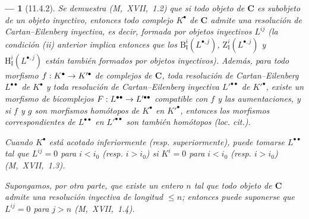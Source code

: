 \documentclass[10pt,oneside,openany]{book}
\theoremstyle{egaenv}\newtheorem*{env}{---}
\theoremstyle{egastatement}
\theoremstyle{egadescription}
\renewcommand{\leq}{\leqslant}
\renewcommand{\to}{\mathchoice{\longrightarrow}{\rightarrow}{\rightarrow}{\rightarrow}}
\begin{document}
\begin{env}[11.4.2]
Se demuestra (M,~XVII,~1.2) que si todo objeto de $\boldsymbol{C}$ es subobjeto de un objeto inyectivo, entonces todo complejo $K^\bullet$ de $\boldsymbol{C}$ admite una resolución de Cartan--Eilenberg \emph{inyectiva}, es decir, formada por objetos inyectivos $L^{ij}$ (la condición (ii) anterior implica entonces que los $\mathrm B_{\mathrm I}^i(L^{\bullet,j})$, $\mathrm Z_{\mathrm I}^i(L^{\bullet,j})$ y
$\mathrm H_{\mathrm I}^i(L^{\bullet,j})$ están también formados por objetos inyectivos).
Además, para todo morfismo $f:K^\bullet\to K'^\bullet$ de complejos de $\boldsymbol{C}$,
toda resolución de Cartan--Eilenberg $L^{\bullet\bullet}$ de $K^\bullet$ y toda resolución de Cartan--Eilenberg \emph{inyectiva} $L'^{\bullet\bullet}$ de $K'^\bullet$, existe un morfismo de bicomplejos $F:L^{\bullet\bullet}\to L'^{\bullet\bullet}$ compatible con $f$ y las aumentaciones, y si $f$ y $g$ son morfismos homótopos de $K^\bullet$ en $K'^\bullet$, entonces los morfismos correspondientes de $L^{\bullet\bullet}$ en $L'^{\bullet\bullet}$ son también homótopos \emph{(loc. cit.)}.

Cuando $K^\bullet$ está \emph{acotado inferiormente} (resp. \emph{superiormente}), puede tomarse $L^{\bullet\bullet}$ tal que $L^{ij}=0$ para $i<i_0$ (resp. $i>i_0$) si $K^i=0$ para $i<i_0$ (resp. $i>i_0$) (M,~XVII,~1.3).

Supongamos, por otra parte, que existe un entero $n$ tal que todo objeto de $\boldsymbol{C}$ admite una \emph{resolución inyectiva de longitud $\leq n$};
entonces puede suponerse que $L^{ij}=0$ para $j>n$ (M,~XVII,~1.4).
\end{env}
\end{document}
